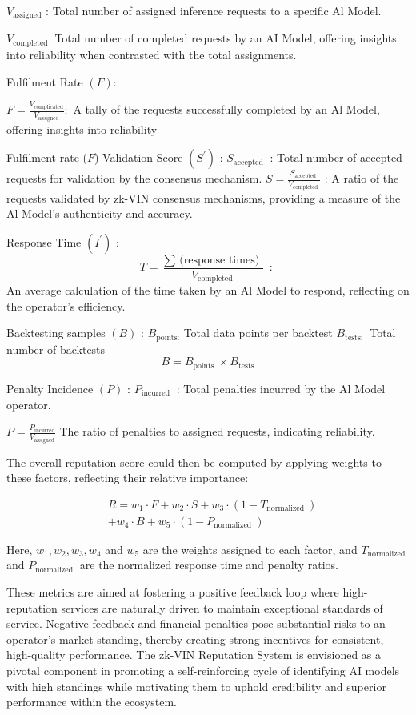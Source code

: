 \documentclass[conference]{IEEEtran}
\begin{document}
$V_{\text{assigned}}$ : Total number of assigned inference requests to a specific Al Model.

$V_{\text {completed }}$ Total number of completed requests by an AI Model, offering insights into reliability  when contrasted with the total assignments.

Fulfilment Rate $(F)$:

$F=\displaystyle \frac{V_{\text {complicated}}}{V_{\text {assigned}}}:$ A tally of the requests successfully completed by an Al Model, offering insights into reliability

Fulfilment rate ($F$)
Validation Score $\left(S^{\prime}\right)$ :
$S_{\text {accepted }}$ : Total number of accepted requests for validation by the consensus mechanism.
$S=\displaystyle \frac{S_{\text {accepted }}}{V_{\text {completed }}}$ : A ratio of the requests validated by zk-VIN consensus mechanisms, providing a measure of the Al Model's authenticity and accuracy.

Response Time $\left(I^{\prime}\right)$ :
$$
T=\frac{\sum \text { (response times) }}{V_{\text {completed }}} \text { : }
$$
An average calculation of the time taken by an Al Model to respond, reflecting on the operator's efficiency.

Backtesting samples $(B)$ :
$B_{\text {points:}}$ Total data points per backtest
$B_{\text {tests: }}$ Total number of backtests
$$
B=B_{\text {points }} \times B_{\text {tests}}
$$

Penalty Incidence $(P)$ :
$P_{\text {incurred }}$ : Total penalties incurred by the Al Model operator. 

$P=\displaystyle \frac{P_{\text {incurred}}}{V_{\text {assigned}}}$ The ratio of penalties to assigned requests, indicating reliability.

The overall reputation score   could then be computed by applying weights to these factors, reflecting their relative importance:

$$
\begin{aligned}
& R=w_1 \cdot F+w_2 \cdot S+w_3 \cdot\left(1-T_{\text {normalized }}\right) \\ & +w_4 \cdot B+w_5 \cdot\left(1-P_{\text {normalized }}\right)
\end{aligned}
$$

Here, $w_1, w_2, w_3, w_4$ and $w_5$ are the weights assigned to each factor, and $T_{\text {normalized }}$ and $P_{\text {normalized }}$ are the normalized response time and penalty ratios.

These metrics are aimed at fostering a positive feedback loop where high-reputation services are naturally driven to maintain exceptional standards of service. Negative feedback and financial penalties pose substantial risks to an operator's market standing, thereby creating strong incentives for consistent, high-quality performance. The zk-VIN Reputation System is envisioned as a pivotal component in promoting a self-reinforcing cycle of identifying AI models with high standings while motivating them to uphold credibility and superior performance within the ecosystem.
\end{document}
